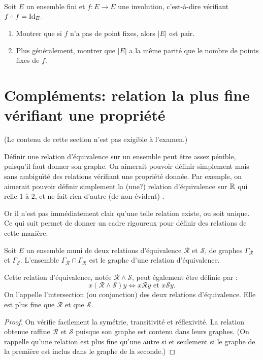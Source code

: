 \begin{exercice}
Soit $E$ un ensemble fini et $f : E\to E$ une involution, c'est-à-dire vérifiant $f\circ f = \operatorname{Id}_E$.
\begin{enumerate}
\item Montrer que si $f$ n'a pas de point fixes, alors $|E|$ est pair.
\item Plus généralement, montrer que $|E|$ a la même parité que le nombre de points fixes de $f$.
\end{enumerate}
\end{exercice}
















\section{Compléments: relation la plus fine vérifiant une propriété}

(Le contenu de cette section n'est pas exigible à l'examen.)

\begin{mdframed}[linewidth=2]
Définir une relation d'équivalence sur un ensemble peut être assez pénible, puisqu'il faut donner son graphe. On aimerait pouvoir définir simplement mais sans ambiguïté des relations vérifiant une propriété donnée. Par exemple, on aimerait pouvoir définir simplement la (une?) relation d'équivalence sur $\mathbb{R}$ qui relie $1$ à $2$, et ne fait \og rien d'autre (de non évident) \fg. 

Or il n'est pas immédiatement clair qu'une telle relation existe, ou soit unique. Ce qui suit permet de donner un cadre rigoureux pour définir des relations de cette manière.
\end{mdframed}

\begin{proposition}
Soit $E$ un ensemble muni de deux relations d'équivalence $\mathcal R$ et $\mathcal S$, de graphes $\Gamma_{\mathcal R}$ et $\Gamma_{\mathcal S}$. L'ensemble $\Gamma_{\mathcal R} \cap \Gamma_{\mathcal R}$ est le graphe d'une relation d'équivalence. 

 Cette relation d'équivalence, notée $\mathcal R \wedge \mathcal S$, peut également être  définie par
:
\[x (\mathcal R \wedge \mathcal S) y \iff x\mathcal R y \text{ et } x\mathcal S y.
\]
On l'appelle l'intersection (ou conjonction) des deux relations d'équivalence. Elle est plus fine que $\mathcal R$ et que $\mathcal S$.
\end{proposition}
\begin{proof}
On vérifie facilement la symétrie, transitivité et réflexivité. La relation obtenue raffine $\mathcal R$ et $\mathcal S$ puisque son graphe est contenu dans leurs graphes. (On rappelle qu'une relation est plus fine qu'une autre si et seulement si le graphe de la première est inclus dans le graphe de la seconde.)
\end{proof}

